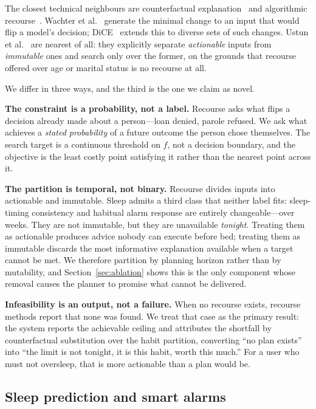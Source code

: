 \documentclass[conference]{IEEEtran}
\begin{document}
The closest technical neighbours are counterfactual explanation~\cite{wachter}
and algorithmic recourse~\cite{ustun,dice}. Wachter et al.~\cite{wachter}
generate the minimal change to an input that would flip a model's decision;
DiCE~\cite{dice} extends this to diverse sets of such changes. Ustun et
al.~\cite{ustun} are nearest of all: they explicitly separate \emph{actionable}
inputs from \emph{immutable} ones and search only over the former, on the
grounds that recourse offered over age or marital status is no recourse at all.

We differ in three ways, and the third is the one we claim as novel.

\textbf{The constraint is a probability, not a label.} Recourse asks what flips
a decision already made about a person---loan denied, parole refused. We ask
what achieves a \emph{stated probability} of a future outcome the person chose
themselves. The search target is a continuous threshold on $f$, not a decision
boundary, and the objective is the least costly point satisfying it rather than
the nearest point across it.

\textbf{The partition is temporal, not binary.} Recourse divides inputs into
actionable and immutable. Sleep admits a third class that neither label fits:
sleep-timing consistency and habitual alarm response are entirely
changeable---over weeks. They are not immutable, but they are unavailable
\emph{tonight}. Treating them as actionable produces advice nobody can execute
before bed; treating them as immutable discards the most informative explanation
available when a target cannot be met. We therefore partition by planning
horizon rather than by mutability, and Section~\ref{sec:ablation} shows this is
the only component whose removal causes the planner to promise what cannot be
delivered.

\textbf{Infeasibility is an output, not a failure.} When no recourse exists,
recourse methods report that none was found. We treat that case as the primary
result: the system reports the achievable ceiling and attributes the shortfall
by counterfactual substitution over the habit partition, converting ``no plan
exists'' into ``the limit is not tonight, it is this habit, worth this much.''
For a user who must not oversleep, that is more actionable than a plan would be.

\subsection{Sleep prediction and smart alarms}
\end{document}
